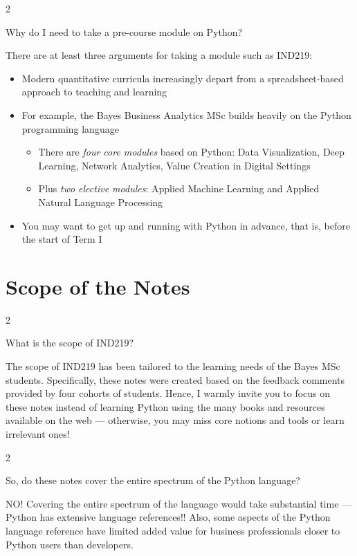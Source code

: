 \documentclass[a4paper,11pt]{book}
\newcommand{\question}[1]{%
    \begin{tcolorbox}[colback=comp_c!10,colframe=comp_c,sidebyside align=top,width=\linewidth,before skip=1ex]
        #1
    \end{tcolorbox}
    \switchcolumn%
}
\newcommand{\note}[1]{%
    \begin{tcolorbox}[colback=white!0,colframe=white!10,width=\linewidth,before skip=1ex]
        #1
    \end{tcolorbox}
}
\begin{document}
\begin{paracol}{2}
	\question{\raggedright Why do I need to take a pre-course module on Python?}
        \note{
	There are at least three arguments for taking a module such as IND219:
	\begin{itemize}
		\item Modern quantitative curricula increasingly depart from a spreadsheet-based approach to teaching and learning
		\item For example, the Bayes Business Analytics MSc builds heavily on the Python programming language
		\begin{itemize}
			\item There are \emph{four core modules} based on Python: Data Visualization, Deep Learning, Network Analytics, Value Creation in Digital Settings
			\item Plus \emph{two elective modules}: Applied Machine Learning and Applied Natural Language Processing
		\end{itemize}
		\item You may want to get up and running with Python in advance, that is, before the start of Term I
	\end{itemize}
	}
\end{paracol}

\section{Scope of the Notes}

\begin{paracol}{2}
	\question{\raggedright What is the scope of IND219?}
	\note{The scope of IND219 has been tailored to the learning needs of the Bayes MSc students. Specifically, these notes were created based on the feedback comments provided by four cohorts of students. Hence, I warmly invite you to focus on these notes instead of learning Python using the many books and resources available on the web --- otherwise, you may miss core notions and tools or learn irrelevant ones!
	}
\end{paracol}
\clearpage

\begin{paracol}{2}
	\question{\raggedright So, do these notes cover the entire spectrum of the Python language?}	
	\note{NO! Covering the entire spectrum of the language would take substantial time --- Python has extensive language references!! Also, some aspects of the Python language reference have limited added value for business professionals closer to Python users than developers.
	}
\end{paracol}
\end{document}
